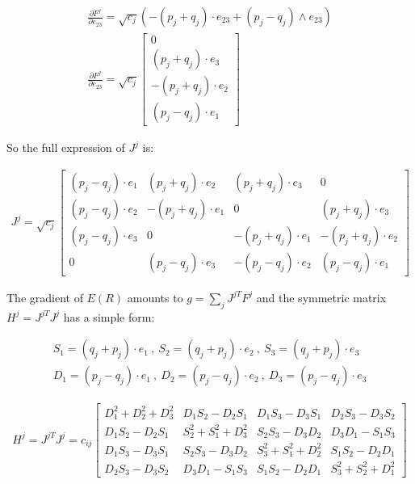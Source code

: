 \documentclass{birkjour}
\numberwithin{equation}{section}
\begin{document}
\begin{eqnarray*}
\frac{\partial F^j}{\partial e_{23}} = \sqrt{c_j} (-(p_j + q_j) \cdot e_{23} + (p_j - q_j) \wedge e_{23})\\
\frac{\partial F^j}{\partial e_{23}} = \sqrt{c_j}
\left[\begin{array}{c} 0 \\ (p_j  + q_j) \cdot e_3 \\ -(p_j  + q_j) \cdot e_2 \\ (p_j - q_j) \cdot e_1\end{array}\right]
\end{eqnarray*}

So the full expression of $J^j$ is:

\begin{eqnarray*}
J^j = \sqrt{c_j}
\left[\begin{array}{cccc}
(p_j - q_j) \cdot e_1 & (p_j + q_j) \cdot e_2  & (p_j  + q_j) \cdot e_3  & 0\\ 
(p_j - q_j) \cdot e_2 & -(p_j + q_j) \cdot e_1 & 0                       & (p_j  + q_j) \cdot e_3\\
(p_j - q_j) \cdot e_3 & 0                      & -(p_j  + q_j) \cdot e_1 & -(p_j  + q_j) \cdot e_2\\ 
0                     & (p_j - q_j) \cdot e_3  & -(p_j - q_j) \cdot e_2  & (p_j - q_j) \cdot e_1
\end{array}\right]
\end{eqnarray*}

The gradient of $E(R)$ amounts to $g = \sum_j{J^{jT} F^j}$ and the symmetric matrix $H^j = J^{jT} J^j$ has a simple form:

\begin{eqnarray*}
S_1 = (q_j + p_j) \cdot e_1 \ , \ S_2 = (q_j + p_j) \cdot e_2 \ , \ S_3 = (q_j + p_j) \cdot e_3\\
D_1 = (p_j - q_j) \cdot e_1 \ , \ D_2 = (p_j - q_j) \cdot e_2 \ , \ D_3 = (p_j - q_j) \cdot e_3
\end{eqnarray*}

\begin{eqnarray*}
H^j = J^{jT} J^j = c_{ij}
\left[\begin{array}{cccc}
D_1^2 + D_2^2 + D_3^2    & D_1 S_2 - D_2 S_1      & D_1 S_3 - D_3 S_1     & D_2 S_3 - D_3 S_2\\ 
D_1 S_2 - D_2 S_1        & S_2^2 + S_1^2 + D_3^2  & S_2 S_3 - D_3 D_2     & D_3 D_1 - S_1 S_3 \\
D_1 S_3 - D_3 S_1        & S_2 S_3 - D_3 D_2      & S_3^2 + S_1^2 + D_2^2 & S_1 S_2 - D_2 D_1\\ 
D_2 S_3 - D_3 S_2        & D_3 D_1 - S_1 S_3      & S_1 S_2 - D_2 D_1     & S_3^2 + S_2^2 + D_1^2
\end{array}\right]
\end{eqnarray*}
\end{document}
